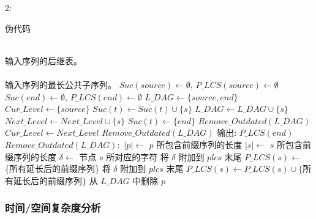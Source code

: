 \begin{varalgorithm}{2:}
  \caption{伪代码}
  \footnotesize
  \label{alg:PMA}
  \begin{algorithmic}[1]
    \REQUIRE ~~\\
    输入序列的后继表。\\
    \ENSURE ~~\\
    输入序列的最长公共子序列。
    \STATE
    \STATE $Suc(source) \leftarrow \emptyset$, $P\_LCS(source) \leftarrow \emptyset$
    \STATE $Suc(end) \leftarrow \emptyset$, $P\_LCS(end) \leftarrow \emptyset$
    \STATE $L\_DAG \leftarrow \{source, end\}$
    \STATE $Cur\_Level \leftarrow \{source\}$
    \STATE
    \STATE $Suc(t) \leftarrow Suc(t) \cup \{s\}$
    \STATE $L\_DAG \leftarrow L\_DAG \cup \{s\}$
    \STATE $Next\_Level \leftarrow Next\_Level \cup \{s\}$
    \ENDIF
    \ENDFOR
    \STATE $Suc(t) \leftarrow \{end\}$
    \ENDIF
    \ENDFOR
    \STATE $Remove\_Outdated(L\_DAG)$
    \STATE $Cur\_Level \leftarrow Next\_Level$
    \ENDWHILE
    \STATE
    \STATE $Remove\_Outdated(L\_DAG)$
    \ENDWHILE
    \STATE
    \STATE 输出: $P\_LCS(end)$
    \STATE
    \STATE $Remove\_Outdated(L\_DAG):$
    \STATE $|p| \leftarrow $ $p$ 所包含前缀序列的长度
    \STATE $|s| \leftarrow $ $s$ 所包含前缀序列的长度
    \STATE $\delta \leftarrow $ 节点 $s$ 所对应的字符
    \STATE 将 $\delta$ 附加到 $plcs$ 末尾
    \ENDFOR
    \STATE $P\_LCS(s) \leftarrow $ \{所有延长后的前缀序列\} 
    \STATE 将 $\delta$ 附加到 $plcs$ 末尾
    \ENDFOR
    \STATE $P\_LCS(s) \leftarrow P\_LCS(s) \cup \{$所有延长后的前缀序列$\}$
    \ENDIF
    \STATE 从 $L\_DAG$ 中删除 $p$
    \ENDFOR
    \ENDFOR
  \end{algorithmic}
\end{varalgorithm}

\subsubsection{时间/空间复杂度分析}
\label{sec:complexity}

